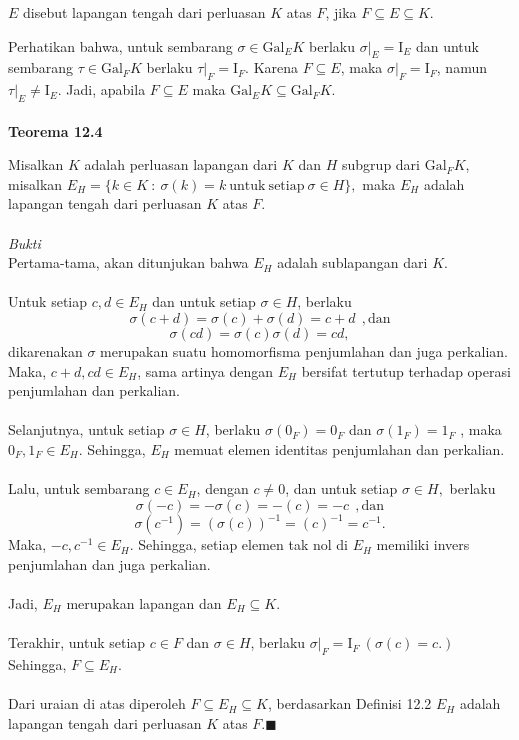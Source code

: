 \par 	$E$ disebut lapangan tengah dari perluasan $K$ atas $F$, jika $F\subseteq E\subseteq K$.
\\ 
\par 	Perhatikan bahwa, untuk sembarang $\sigma \in \mathrm{Gal}_{E}K$ berlaku $\sigma|_E=\mathrm{I}_E$ dan untuk sembarang $\tau \in \mathrm{Gal}_{F}K$ berlaku $\tau|_F=\mathrm{I}_F.$ Karena $F \subseteq E$, maka $\sigma|_F=\mathrm{I}_F$, namun $\tau|_E   		\ne \mathrm{I}_E.$ Jadi, apabila $F \subseteq E$ maka  $\mathrm{Gal}_{E}K \subseteq  \mathrm{Gal}_{F}K$.
\\ \\
	\textbf{Teorema 12.4}
\par 	Misalkan $K$ adalah perluasan lapangan dari $K$ dan $H$ subgrup dari $\mathrm{Gal}_{F}K$, misalkan $E_H=\{k\in K~:~\sigma(k)=k \mathrm{~untuk~setiap~} \sigma \in H\},$ maka $E_H$ adalah lapangan tengah dari perluasan $K$ atas $F$.
\\ \\
	\textit{Bukti}
\\	Pertama-tama, akan ditunjukan bahwa $E_H$ adalah sublapangan dari $K$.
\\ \\ 	Untuk setiap $c,d\in E_H$ dan untuk setiap $\sigma\in H$, berlaku
	$$\sigma(c+d)=\sigma(c)+\sigma(d)=c+d~~,\mathrm{dan}$$
	$$\sigma(cd)=\sigma(c)\sigma(d)=cd,$$
	dikarenakan $\sigma$ merupakan suatu homomorfisma penjumlahan dan juga perkalian. Maka, $c+d,cd\in E_H$, sama artinya dengan $E_H$ bersifat tertutup terhadap operasi penjumlahan dan perkalian.	
\\ \\ 	Selanjutnya, untuk setiap $\sigma \in H$, berlaku $\sigma(0_F)=0_F$ dan $\sigma(1_F)=1_F$ , maka $0_F,1_F \in E_H.$ Sehingga, $E_H$ memuat elemen identitas penjumlahan dan perkalian.
\\ \\ 	Lalu, untuk sembarang $c\in E_H$, dengan $c \ne 0$, dan untuk setiap $\sigma \in H,$ berlaku
	$$\sigma(-c)=-\sigma(c)=-(c)=-c~~,\mathrm{dan}$$
	$$\sigma(c^{-1})=(\sigma(c))^{-1}=(c)^{-1}=c^{-1}.$$
	Maka, $-c,c^{-1}\in E_H.$ Sehingga, setiap elemen tak nol di $E_H$ memiliki invers penjumlahan dan juga perkalian.
\\ \\ 	Jadi, $E_H$ merupakan lapangan dan $E_H\subseteq K.$
\\ \\ 	Terakhir, untuk setiap $c\in F$ dan $\sigma \in H$, berlaku $\sigma|_F=\mathrm{I}_F~(\sigma(c)=c.)$ Sehingga, $F\subseteq E_H.$
\\ \\ 	Dari uraian di atas diperoleh $F \subseteq E_H\subseteq K$, berdasarkan Definisi 12.2 $E_H$ adalah lapangan tengah dari perluasan $K$ atas $F$.$\blacksquare$ \\

